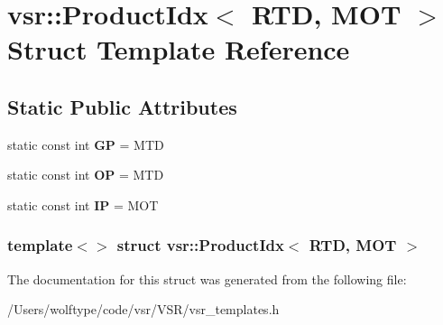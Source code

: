 \hypertarget{structvsr_1_1_product_idx_3_01_r_t_d_00_01_m_o_t_01_4}{\section{vsr\-:\-:Product\-Idx$<$ R\-T\-D, M\-O\-T $>$ Struct Template Reference}
\label{structvsr_1_1_product_idx_3_01_r_t_d_00_01_m_o_t_01_4}
}
\subsection*{Static Public Attributes}
\begin{DoxyCompactItemize}
\item 
\hypertarget{structvsr_1_1_product_idx_3_01_r_t_d_00_01_m_o_t_01_4_ab6241750e75f8d8accc329465ae19539}{static const int {\bfseries G\-P} = M\-T\-D}\label{structvsr_1_1_product_idx_3_01_r_t_d_00_01_m_o_t_01_4_ab6241750e75f8d8accc329465ae19539}

\item 
\hypertarget{structvsr_1_1_product_idx_3_01_r_t_d_00_01_m_o_t_01_4_a1c5186331d2abb733b9d915d8a94bb1a}{static const int {\bfseries O\-P} = M\-T\-D}\label{structvsr_1_1_product_idx_3_01_r_t_d_00_01_m_o_t_01_4_a1c5186331d2abb733b9d915d8a94bb1a}

\item 
\hypertarget{structvsr_1_1_product_idx_3_01_r_t_d_00_01_m_o_t_01_4_aec18a01a7cd12010797beba66444dccd}{static const int {\bfseries I\-P} = M\-O\-T}\label{structvsr_1_1_product_idx_3_01_r_t_d_00_01_m_o_t_01_4_aec18a01a7cd12010797beba66444dccd}

\end{DoxyCompactItemize}
\subsubsection*{template$<$$>$ struct vsr\-::\-Product\-Idx$<$ R\-T\-D, M\-O\-T $>$}



The documentation for this struct was generated from the following file\-:\begin{DoxyCompactItemize}
\item 
/\-Users/wolftype/code/vsr/\-V\-S\-R/vsr\-\_\-templates.\-h\end{DoxyCompactItemize}
